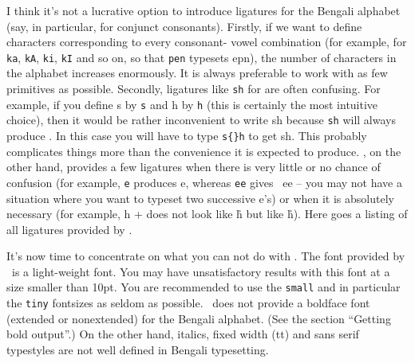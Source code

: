 I think it's not a lucrative option to introduce ligatures for
the Bengali alphabet (say, in particular, for conjunct consonants).
Firstly, if we want to define characters corresponding to every consonant-%
vowel combination (for example, for {\tt ka}, {\tt kA}, {\tt ki}, {\tt kI}
and so on, so that {\tt pen} typesets {\bn epn}), the number of
characters in the alphabet increases enormously. It is always
preferable to work with as few primitives as possible. Secondly,
ligatures like {\tt sh} for {\bn \sh} are often confusing. For example,
if you define {\bn s} by {\tt s} and {\bn h} by {\tt h} (this is certainly
the most intuitive choice), then it would be rather inconvenient
to write {\bn sh} because {\tt sh} will always produce {\bn \sh}. In
this case you will have to type {\tt s\{\}h} to get {\bn sh}. This
probably complicates things more than the convenience it is expected
to produce. \bwti, on the other hand, provides a few ligatures when
there is very little or no chance of confusion (for example, {\tt e}
produces {\bn e}, whereas {\tt ee} gives {\bn\ ee} -- you may not have
a situation where you want to typeset two successive {\bn e}'s)
or when it is absolutely necessary (for example, {\bn h + \R} does not
look like {\bn h{}\r} but like {\bn h\r}). Here goes a listing of all
ligatures provided by \bwti.


It's now time to concentrate on what you can not do with \bwti.
The font provided by \bwti\ is a light-weight font. You may have
unsatisfactory results with this font at a size smaller than 10pt.
You are recommended to use the {\tt \bs small} and in particular the
{\tt \bs tiny} fontsizes as seldom as possible.  \bwti\ does not provide
a boldface font (extended or nonextended) for the Bengali alphabet.
(See the section ``Getting bold output''.)
On the other hand, italics, fixed width (tt) and sans serif typestyles are not well
defined in Bengali typesetting.

